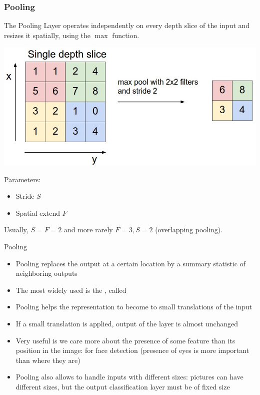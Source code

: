 \begin{frame}
	\frametitle{Pooling}
	
	The Pooling Layer operates independently on every depth slice of the input and resizes it spatially, using the $\max$ function. 
	
	\begin{center}
		\includegraphics[scale=0.3]{figs/maxpool}
	\end{center}

Parameters: 
\begin{itemize}
	\item Stride $S$
	\item Spatial extend $F$
\end{itemize}

Usually, $S=F=2$ and more rarely $F=3, S=2$ (overlapping pooling).
\end{frame}

\begin{frame}{Pooling}
	\begin{itemize}
		\item Pooling replaces the output at a certain location by a summary statistic of neighboring outputs
		
		\medskip 
		
		\item The most widely used is the , called 
		
		\medskip 
				
		\item Pooling helps the representation to become  to small translations of the input
		
		\medskip 
				
		\item If a small translation is applied, output of the layer is almost unchanged
		
		\medskip 
				
		\item Very useful is we care more about the presence of some feature than its position in the image: for face detection (presence of eyes is more important than where they are)
		
		\medskip 
				
		\item   Pooling also allows to handle inputs with different sizes: pictures can have different sizes, but the output classification layer must be of fixed size
	\end{itemize}  
\end{frame}


